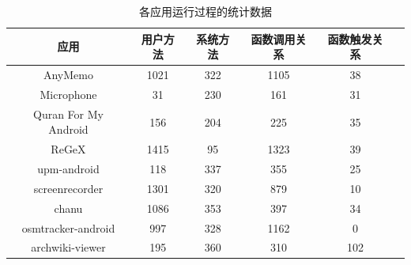 \begin{table}[!ht]
	\centering
	{
		\tablewuhao
		\caption{各应用运行过程的统计数据}
		\label{table:app_results}
		\begin{tabular}{ |c |c|c|c|c|c|}
			\hline
			应用 &用户方法&系统方法&函数调用关系&函数触发关系\\ 
			\hline			
			AnyMemo & 1021 & 322 & 1105& 38 \\ 				
			\hline	
			Microphone & 31 & 230 & 161&31 \\ 				
			\hline	
			Quran For My Android & 156 & 204 & 225&  35 \\ 				
			\hline	
			ReGeX & 1415 &95  & 1323& 39\\ 				
			\hline	
			upm-android & 118& 337& 355&  25 \\ 		
			\hline		
			screenrecorder& 1301 & 320 &879 & 10\\ 				
			\hline	
			chanu & 1086& 353 & 397& 34 \\ 	
			\hline	
			osmtracker-android & 997& 328 & 1162& 0 \\ 	
			\hline	
			archwiki-viewer & 195 & 360 & 310& 102 \\ 				
			\hline	
		\end{tabular}
	}
\end{table}


